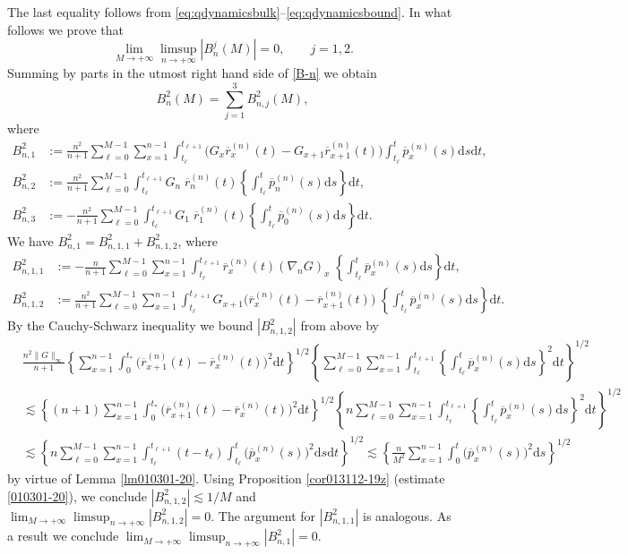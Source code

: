 \documentclass[EJP]{ejpecp} %
\newcommand{\dd  }{\mathrm{d}}
\renewcommand{\bar}{\overline}
\numberwithin{equation}{section}
\begin{document}
The last equality follows from \eqref{eq:qdynamicsbulk}--\eqref{eq:qdynamicsbound}. 
In what follows we prove that
\begin{equation}
\label{010502-20}
\lim_{M\to+\infty}\limsup_{n\to+\infty}|B_n^j(M)|=0,\qquad j=1,2.
\end{equation}
Summing by parts in the utmost right hand side of \eqref{B-n} we
obtain 
$$
B_n^2(M)=\sum_{j=1}^3B_{n,j}^2(M),
$$
where
\begin{align*}
B_{n,1}^2&:=\frac{n^2}{n+1}\sum_{\ell=0}^{M-1}\sum_{x=1}^{n-1} \int_{t_\ell}^{t_{\ell+1}} \big(G_x\bar
r^{(n)}_x (t) -G_{x+1}\bar
r^{(n)}_{x+1} (t)\big)\int_{t_\ell}^t  \bar
p^{(n)}_x (s)\dd s  \dd t,  \\
B_{n,2}^2&:=\frac{n^2}{n+1}\sum_{\ell=0}^{M-1} \int_{t_\ell}^{t_{\ell+1}} G_n\; \bar
r^{(n)}_n (t) \left\{\int_{t_\ell}^t  \bar
p^{(n)}_n (s) \dd s  \right\} \dd t, \\
B_{n,3}^2&:=-\frac{n^2}{n+1}\sum_{\ell=0}^{M-1} \int_{t_\ell}^{t_{\ell+1}} G_1\; \bar
r^{(n)}_1 (t)\left\{ \int_{t_\ell}^t  \bar
p^{(n)}_0 (s) \dd s \right\} \dd t.
\end{align*}
We have $B_{n,1}^2=B_{n,1,1}^2+B_{n,1,2}^2$, where
\begin{align*}
B_{n,1,1}^2&:=-\frac{n}{n+1}\sum_{\ell=0}^{M-1}\sum_{x=1}^{n-1} \int_{t_\ell}^{t_{\ell+1}} \bar
r^{(n)}_x (t) (\nabla_nG)_x \; \left\{\int_{t_\ell}^t\bar
p^{(n)}_x (s)  \dd s\right\} \dd t ,\\
 B_{n,1,2}^2&:=\frac{n^2}{n+1}\sum_{\ell=0}^{M-1}\sum_{x=1}^{n-1} \int_{t_\ell}^{t_{\ell+1}} G_{x+1}\big(\bar
 r^{(n)}_x (t)-\bar
 r^{(n)}_{x+1} (t)\big)\; \left\{\int_{t_\ell}^t\bar
 p^{(n)}_x (s)\dd s  \right\}\dd t.
\end{align*}
By the Cauchy-Schwarz inequality we  bound $|B_{n,1,2}^2|$ from above by
\begin{align*}
& \frac{n^2\|G\|_{\infty}}{n+1}\left\{ \sum_{x=1}^{n-1}\int_{0}^{t_*}\big(\bar
r^{(n)}_{x+1} (t)-\bar
r^{(n)}_x (t)\big)^2 \dd t\right\}^{1/2}\left\{ \sum_{\ell=0}^{M-1}\sum_{x=1}^{n-1}\int_{t_\ell}^{t_{\ell+1}}\left\{\int_{t_\ell}^t\bar
p^{(n)}_x (s)\dd s \right\}^2 \dd t \right\}^{1/2}\\
&
\lesssim \left\{ (n+1)\sum_{x=1}^{n-1}\int_{0}^{t_*}\big(\bar
r^{(n)}_{x+1} (t)-\bar
r^{(n)}_x (t)\big)^2 \dd t\right\}^{1/2}\left\{ n\sum_{\ell=0}^{M-1}\sum_{x=1}^{n-1}\int_{t_\ell}^{t_{\ell+1}}\left\{\int_{t_\ell}^t\bar
p^{(n)}_x (s)\dd s \right\}^2 \dd t \right\}^{1/2}\\
&
\lesssim \left\{ n\sum_{\ell=0}^{M-1}\sum_{x=1}^{n-1}\int_{t_\ell}^{t_{\ell+1}}(t-t_\ell) \int_{t_\ell}^t
\big(\bar p^{(n)}_x (s)\big)^2\dd s  \dd t \right\}^{1/2} \lesssim \left\{\frac{n}{M^2} \sum_{x=1}^{n-1} \int_0^t \big(\bar p^{(n)}_x (s)\big)^2\dd s \right\}^{1/2} 
\end{align*}
by virtue of Lemma \ref{lm010301-20}. Using Proposition \ref{cor013112-19z}  (estimate
\eqref{010301-20}), we conclude  $|B_{n,1,2}^2| \lesssim 1/M$ and $\lim_{M\to+\infty}\limsup_{n\to+\infty}|B_{n,1,2}^2|=0$.
The argument for $|B_{n,1,1}^2|$ is
analogous. As a result we conclude $\lim_{M\to+\infty}\limsup_{n\to+\infty}|B_{n,1}^2|=0$.
\end{document}
